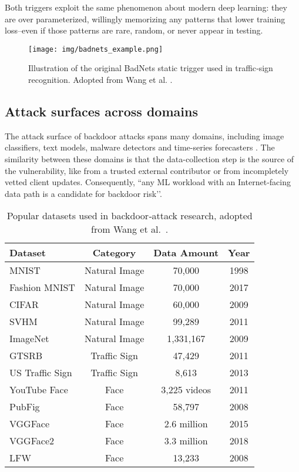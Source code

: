 \documentclass[sigconf,authorversion,nonacm,balance=false]{acmart}
\begin{document}
Both triggers exploit the same phenomenon about modern deep learning: they are over parameterized, willingly memorizing any patterns that lower training loss–even if those patterns are rare, random, or never appear in testing. \cite{background_attack_defense_goldblum_2023}


\begin{figure}[t]
  \centering
  \texttt{[image: img/badnets\_example.png]}%
  \caption{Illustration of the original BadNets static trigger used in traffic‑sign recognition. Adopted from Wang et al. \cite{attack_defense_wang_2023}.}
  \label{fig:badnets}
\end{figure}

\subsection{Attack surfaces across domains}
The attack surface of backdoor attacks spans many domains, including image classifiers, text models, malware detectors and time-series forecasters \cite{background_attack_defense_xue_2020}. The similarity between these domains is that the data-collection step is the source of the vulnerability, like from a trusted external contributor or from incompletely vetted client updates. Consequently, “any ML workload with an Internet‑facing data path is a candidate for backdoor risk’’\cite{background_attack_defense_cina_2024}.

\begin{table}[t]
  \centering
  \caption{Popular datasets used in backdoor‑attack research, adopted from Wang et al.~\cite{attack_defense_wang_2023}.}
  \label{tab:dataset-summary}
  \begin{tabular}{@{}lccc@{}}
    \toprule
    \textbf{Dataset} & \textbf{Category} & \textbf{Data Amount} & \textbf{Year} \\
    \midrule
    MNIST & Natural Image & 70,000 & 1998 \\
    Fashion MNIST & Natural Image & 70,000 & 2017 \\
    CIFAR & Natural Image & 60,000 & 2009 \\
    SVHM & Natural Image & 99,289 & 2011 \\
    ImageNet & Natural Image & 1,331,167 & 2009 \\
    GTSRB & Traffic Sign & 47,429 & 2011 \\
    US Traffic Sign & Traffic Sign & 8,613 & 2013 \\
    YouTube Face & Face & 3,225 videos & 2011 \\
    PubFig & Face & 58,797 & 2008 \\
    VGGFace & Face & 2.6 million & 2015 \\
    VGGFace2 & Face & 3.3 million & 2018 \\
    LFW & Face & 13,233 & 2008 \\
    \bottomrule
  \end{tabular}
\end{table}
\end{document}
